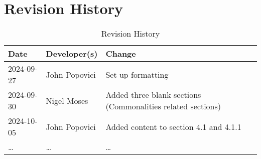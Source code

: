 \section*{Revision History}

\begin{table}[hp]
\caption{Revision History} \label{TblRevisionHistory}
\begin{tabularx}{\textwidth}{llX}
\toprule
\textbf{Date} & \textbf{Developer(s)} & \textbf{Change}\\
\midrule
2024-09-27 & John Popovici & Set up formatting\\
2024-09-30 & Nigel Moses & Added three blank sections (Commonalities related sections)\\
2024-10-05 & John Popovici & Added content to section 4.1 and 4.1.1\\
\dots & \dots & \dots\\
\bottomrule
\end{tabularx}
\end{table}

